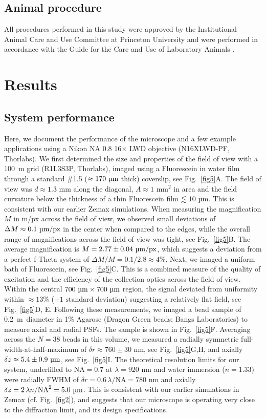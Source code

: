 \documentclass[10pt,letterpaper]{article}
\newcommand{\microns}{~\textmu m~} %
\begin{document}
\subsection*{Animal procedure}
All procedures performed in this study were approved by the Institutional Animal Care and Use Committee at Princeton University and were performed in accordance with the Guide for the Care and Use of Laboratory Animals \cite{Guide2011}.

\section*{Results}

\subsection*{System performance}
%
Here, we document the performance of the microscope and a few example applications using a Nikon NA 0.8 16$\times$ LWD objective (N16XLWD-PF, Thorlabs). We first determined the size and properties of the field of view with a 100~\textmu m grid (R1L3S3P, Thorlabs), imaged using a Fluorescein in water film through a standard \#1.5 ($\approx170\text{ \textmu m}$ thick) coverslip, see Fig.~\ref{fig5}A. The field of view was $d\approx1.3\text{ mm}$ along the diagonal, $A\approx 1\text{ mm}^2$ in area and the field curvature below the thickness of a thin Fluorescein film $\lesssim 10\text{ \textmu m}$. This is consistent with our earlier Zemax simulations. When measuring the magnification $M$ in \textmu m/px across the field of view, we observed small deviations of $\Delta M \approx 0.1\text{ \textmu m/px}$ in the center when compared to the edges, while the overall range of magnifications across the field of view was tight, see Fig.~\ref{fig5}B. The average magnification is $M=2.77\pm0.04\text{ \textmu m/px}$, which suggests a deviation from a perfect f-Theta system of $\Delta M/M = 0.1/2.8 \approx 4\%$. Next, we imaged a uniform bath of Fluorescein, see Fig.~\ref{fig5}C. This is a combined measure of the quality of excitation and the efficiency of the collection optics across the field of view. Within the central $700\text{ \textmu m} \times 700\text{ \textmu m}$ region, the signal deviated from uniformity within $\approx 13\%$ ($\pm 1 \text{ standard deviation}$) suggesting a relatively flat field, see Fig.~\ref{fig5}D, E. Following these measurements, we imaged a bead sample of 0.2\microns diameter in 1\% Agarose (Dragon Green beads; Bangs Laboratories) to measure axial and radial PSFs. The sample is shown in Fig.~\ref{fig5}F. Averaging across the $N=38$ beads in this volume, we measured a radially symmetric full-width-at-half-maximum of $\delta r\approx760\pm30\text{ nm}$, see Fig.~\ref{fig5}G,H, and axially $\delta z \approx 5.4\pm0.9\text{ \textmu m}$, see Fig.~\ref{fig5}I. The theoretical resolution limits\cite{Tsai2002} for our system, underfilled to $\text{NA}=0.7$ at $\lambda=920\text{ nm}$ and water immersion ($n=1.33$) were radially FWHM of $\delta r=0.6\,\lambda/\text{NA}=780\text{ nm}$ and axially $\delta z = 2\,\lambda n/\text{NA}^2=5.0\text{ \textmu m}$. This is consistent with our earlier simulations in Zemax (cf. Fig.~\ref{fig2}), and suggests that our microscope is operating very close to the diffraction limit, and its design specifications.
\end{document}
